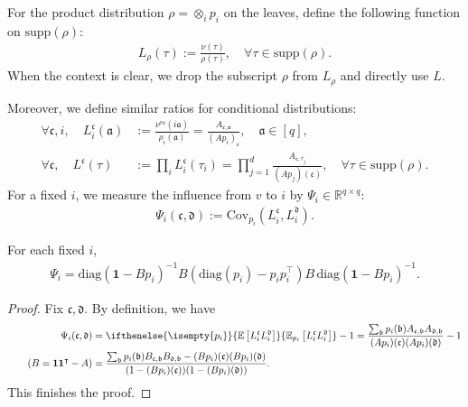 \documentclass[a4paper,12pt]{article}
\theoremstyle{plain}
\theoremstyle{definition}
\def\*#1{\mathbf{#1}} %
\def\-#1{\mathrm{#1}} %
\def\!#1{\mathfrak{#1}} %
\def\*#1{\boldsymbol{#1}} %
\def\-#1{\mathrm{#1}} %
\def\!#1{\mathfrak{#1}} %
\def\oE{\mathbb{E}}
\newcommand{\E}[2][]{ \ifthenelse{\isempty{#1}}
  {\oE\left[#2\right]}
  {\oE_{#1}\left[#2\right]} }
\newcommand{\tuple}[1]{\left(#1\right)}
\newcommand{\tp}{\tuple}
\begin{document}
\begin{definition}\label{def:L}
  For the product distribution $\rho = \otimes_i p_i$ on the leaves, define the following function on $\-{supp}(\rho)$:
  \begin{align*}
    L_\rho(\tau) := \frac{\nu(\tau)}{\rho(\tau)}, \quad \forall \tau \in \-{supp}(\rho).
  \end{align*}
  When the context is clear, we drop the subscript $\rho$ from $L_\rho$ and directly use $L$.

  Moreover, we define similar ratios for conditional distributions:
  \begin{align*}
    \forall \!c,i, \quad L^{\!c}_i(\!a) &:= \frac{\nu^{v\!c}(i\!a)}{\rho_i(\!a)} = \frac{A_{\!c,\!a}}{(Ap_i)_{\!c}}, \quad \!a\in [q],\\
    \forall \!c, \quad L^{\!c}(\tau) &:= \prod_i L_i^{\!c}(\tau_i) = \prod_{j=1}^d \frac{A_{\!c,\tau_j}}{(Ap_j)(\!c)}, \quad \forall \tau \in \mathrm{supp}(\rho).
  \end{align*}
  For a fixed $i$, we measure the influence from $v$ to $i$ by $\Psi_i \in \mathbb{R}^{q\times q}$:
\begin{align*}
  \Psi_{i}(\!c,\!d) := \mathrm{Cov}_{p_i}(L^{\!c}_i,L^{\!d}_i).
\end{align*}
\end{definition}


\begin{proposition} \label{prop:Psi-i}
  For each fixed $i$,
  \begin{align*}
    \Psi_i = \mathrm{diag}(\*1-Bp_i)^{-1}B\tp{\mathrm{diag}(p_i) - p_ip_i^\intercal}B \, \mathrm{diag}(\*1-Bp_i)^{-1}.
  \end{align*}
\end{proposition}
\begin{proof}
  Fix $\!c,\!d$. By definition, we have
  \begin{align*}
    \Psi_i(\!c,\!d)
    &= \E[p_i]{L^{\!c}_i L^{\!d}_i} - 1 
    =   \frac{\sum_{\!b}p_i(\!b)A_{\!c,\!b}A_{\!d,\!b}}{(Ap_i)(\!c) (Ap_i)(\!d)} - 1 \\
    \tag{$B = \*1\*1^\intercal - A$}
    &=   \frac{\sum_{\!b}p_i(\!b)B_{\!c,\!b}B_{\!d,\!b} -(Bp_i)(\!c)(Bp_i)(\!d)}{(1-(Bp_i)(\!c))(1 - (Bp_i)(\!d))}.
  \end{align*}
  This finishes the proof.
\end{proof}
\end{document}
